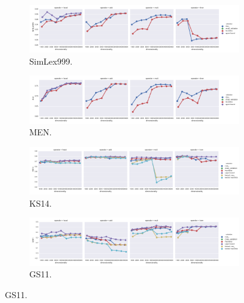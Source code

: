 \begin{figure}
  \centering

  \begin{subfigure}[t]{\textwidth}
    \includegraphics[width=\textwidth]{supplement/figures/universal-results-simlex999}
    \caption{SimLex999.}
    \label{fig:universal-results-simlex}
  \end{subfigure}

  \begin{subfigure}[t]{\textwidth}
    \includegraphics[width=\textwidth]{supplement/figures/universal-results-men}
    \caption{MEN.}
    \label{fig:universal-results-men}
  \end{subfigure}


  \begin{subfigure}[t]{\textwidth}
    \includegraphics[width=\textwidth]{supplement/figures/universal-results-ks14}
    \caption{KS14.}
    \label{fig:universal-results-ks14}
  \end{subfigure}

  \begin{subfigure}[t]{\textwidth}
    \includegraphics[width=\textwidth]{supplement/figures/universal-results-gs11}
    \caption{GS11.}
    \label{fig:universal-results-gs11}
  \end{subfigure}


\end{figure}
